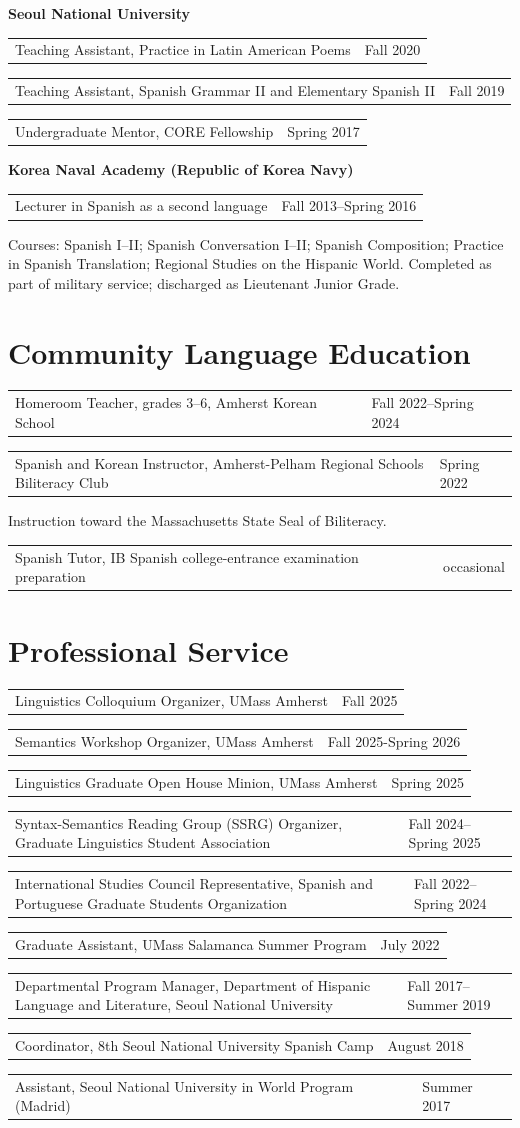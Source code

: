 \documentclass[10pt,letterpaper]{article}
\makeatletter
\newcommand{\datedentry}[2]{%
  \noindent\begin{tabularx}{\textwidth}{@{}X>{\raggedleft\arraybackslash}p{1.45in}@{}}
    #1 & \textcolor{muted}{#2}
  \end{tabularx}\par
}
\newcommand{\subentry}[1]{%
  \hspace*{0.9em}\begin{minipage}{\dimexpr\textwidth-0.9em\relax}
    \small #1
  \end{minipage}\par
}
\makeatother
\begin{document}
\vspace{3pt}
\textbf{Seoul National University}

\datedentry{Teaching Assistant, Practice in Latin American Poems}{Fall 2020}
\datedentry{Teaching Assistant, Spanish Grammar II and Elementary Spanish II}{Fall 2019}
\datedentry{Undergraduate Mentor, CORE Fellowship}{Spring 2017}

\vspace{3pt}
\textbf{Korea Naval Academy (Republic of Korea Navy)}

\datedentry{Lecturer in Spanish as a second language}{Fall 2013--Spring 2016}
\subentry{Courses: Spanish I--II; Spanish Conversation I--II; Spanish Composition; Practice in Spanish Translation; Regional Studies on the Hispanic World. Completed as part of military service; discharged as Lieutenant Junior Grade.}

\section{Community Language Education}

\datedentry{Homeroom Teacher, grades 3--6, Amherst Korean School}{Fall 2022--Spring 2024}
\datedentry{Spanish and Korean Instructor, Amherst-Pelham Regional Schools Biliteracy Club}{Spring 2022}
\subentry{Instruction toward the Massachusetts State Seal of Biliteracy.}
\datedentry{Spanish Tutor, IB Spanish college-entrance examination preparation}{occasional}

\section{Professional Service}

\datedentry{Linguistics Colloquium Organizer, UMass Amherst}{Fall 2025}
\datedentry{Semantics Workshop Organizer, UMass Amherst}{Fall 2025-Spring 2026}
\datedentry{Linguistics Graduate Open House Minion, UMass Amherst}{Spring 2025}
\datedentry{Syntax-Semantics Reading Group (SSRG) Organizer, Graduate Linguistics Student Association}{Fall 2024--Spring 2025}
\datedentry{International Studies Council Representative, Spanish and Portuguese Graduate Students Organization}{Fall 2022--Spring 2024}
\datedentry{Graduate Assistant, UMass Salamanca Summer Program}{July 2022}
\datedentry{Departmental Program Manager, Department of Hispanic Language and Literature, Seoul National University}{Fall 2017--Summer 2019}
\datedentry{Coordinator, 8th Seoul National University Spanish Camp}{August 2018}
\datedentry{Assistant, Seoul National University in World Program (Madrid)}{Summer 2017}
\end{document}
